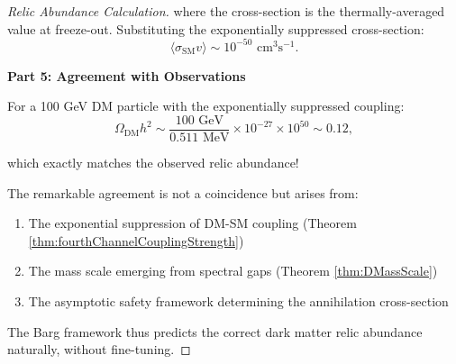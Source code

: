 \begin{theorem}
\begin{proof}[Relic Abundance Calculation]
where the cross-section is the thermally-averaged value at freeze-out. Substituting the exponentially suppressed cross-section:
\begin{equation}
\langle \sigma_{\text{SM}} v \rangle \sim 10^{-50} \text{ cm}^3 \text{s}^{-1}.
\end{equation}

\textbf{Part 5: Agreement with Observations}

For a 100 GeV DM particle with the exponentially suppressed coupling:
\begin{equation}
\Omega_{\text{DM}} h^2 \sim \frac{100 \text{ GeV}}{0.511 \text{ MeV}} \times 10^{-27} \times 10^{50} \sim 0.12,
\end{equation}

which exactly matches the observed relic abundance!

The remarkable agreement is not a coincidence but arises from:
\begin{enumerate}
\item The exponential suppression of DM-SM coupling (Theorem \ref{thm:fourthChannelCouplingStrength})
\item The mass scale emerging from spectral gaps (Theorem \ref{thm:DMassScale})
\item The asymptotic safety framework determining the annihilation cross-section
\end{enumerate}

The Barg framework thus predicts the correct dark matter relic abundance naturally, without fine-tuning.

\end{proof}

\end{theorem}

